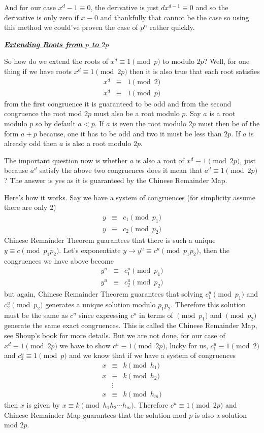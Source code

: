 \documentclass[aps,preprint,preprintnumbers,nofootinbib,showpacs,prd]{revtex4-1}
\newcommand{\nbea}{\begin{eqnarray*}}
\newcommand{\neea}{\end{eqnarray*}}
\begin{document}
And for our case $x^d - 1 \equiv 0$, the derivative is just $d x^{d-1} \equiv 0$ and so the derivative is only zero if $x \equiv 0$ and thankfully that cannot be the case so using this method we could've proven the case of $p^\alpha$ rather quickly.


\bigskip
\underline{\textit{\textbf{Extending Roots from $p$ to $2p$}}}
\bigskip

So how do we extend the roots of $x^d \equiv 1 \pmod{p}$ to modulo $2p$? Well, for one thing if we have roots $x^d \equiv 1 \pmod{2p}$ then it is also true that each root satisfies
%
\nbea
x^d & \equiv & 1 \pmod{2} \\
x^d & \equiv & 1 \pmod{p}
\neea
%
from the first congruence it is guaranteed to be odd and from the second congruence the root mod $2p$ must also be a root modulo $p$. Say $a$ is a root modulo $p$ so by default $a < p$. If $a$ is even the root modulo $2p$ must then be of the form $a + p$ because, one it has to be odd and two it must be less than $2p$. If $a$ is already odd then $a$ is also a root modulo $2p$. 

The important question now is whether $a$ is also a root of $x^d \equiv 1 \pmod{2p}$, just because $a^d$ satisfy the above two congruences does it mean that $a^d \equiv 1 \pmod{2p}$? The answer is yes as it is guaranteed by the Chinese Remainder Map.

Here's how it works. Say we have a system of congruences (for simplicity assume there are only 2)
%
\nbea
y & \equiv & c_1 \pmod{p_1} \\
y & \equiv & c_2 \pmod{p_2}
\neea
%
Chinese Remainder Theorem guarantees that there is such a unique $y \equiv c \pmod{p_1p_2}$. Let's exponentiate $y \to y^u \equiv c^u \pmod{p_1p_2}$, then the congruences we have above become
%
\nbea
y^u & \equiv & c_1^u \pmod{p_1} \\
y^u & \equiv & c^u_2 \pmod{p_2}
\neea
%
but again, Chinese Remainder Theorem guarantees that solving $c_1^u \pmod{p_1}$ and $c^u_2 \pmod{p_2}$ generates a unique solution modulo $p_1p_2$. Therefore this solution must be the same as $c^u$ since expressing $c^u$ in terms of $\pmod{p_1}$ and $\pmod{p_2}$ generate the same exact congruences. This is called the Chinese Remainder Map, see Shoup's book for more details. But we are not done, for our case of $x^d \equiv 1 \pmod{2p}$ we have to show $c^u \equiv 1 \pmod{2p}$, lucky for us, $c_1^u \equiv 1 \pmod{2}$ and $c_2^u \equiv 1 \pmod{p}$ and we know that if we have a system of congruences
%
\nbea
x & \equiv & k \pmod{h_1} \\
x & \equiv & k \pmod{h_2} \\
& \vdots & \\
x & \equiv & k \pmod{h_m}
\neea
%
then $x$ is given by $x \equiv k \pmod{h_1h_2\cdots h_m}$. Therefore $c^u \equiv 1 \pmod{2p}$ and Chinese Remainder Map guarantees that the solution mod $p$ is also a solution mod $2p$.
\end{document}
